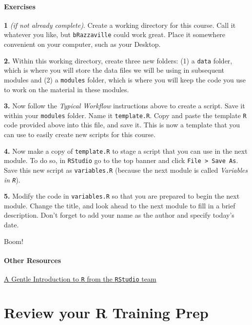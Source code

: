\documentclass[
]{book}
\begin{document}
\subsubsection*{Exercises}\label{exercises}

\textbf{1} \emph{(if not already complete)}. Create a working directory for this course. Call it whatever you like, but \texttt{bRazzaville} could work great. Place it somewhere convenient on your computer, such as your Desktop.

\textbf{2.} Within this working directory, create three new folders: (1) a \texttt{data} folder, which is where you will store the data files we will be using in subsequent modules and (2) a \texttt{modules} folder, which is where you will keep the code you use to work on the material in these modules.

\textbf{3.} Now follow the \emph{Typical Workflow} instructions above to create a script. Save it within your \texttt{modules} folder. Name it \texttt{template.R}. Copy and paste the template \texttt{R} code provided above into this file, and save it. This is now a template that you can use to easily create new scripts for this course.

\textbf{4.} Now make a copy of \texttt{template.R} to stage a script that you can use in the next module. To do so, in \texttt{RStudio} go to the top banner and click \texttt{File\ \textgreater{}\ Save\ As}. Save this new script as \texttt{variables.R} (because the next module is called \emph{Variables in \texttt{R}}).

\textbf{5.} Modify the code in \texttt{variables.R} so that you are prepared to begin the next module. Change the title, and look ahead to the next module to fill in a brief description. Don't forget to add your name as the author and specify today's date.

Boom!

\subsubsection*{Other Resources}\label{other-resources-1}

\href{https://www.rstudio.com/resources/webinars/a-gentle-introduction-to-tidy-statistics-in-r/}{A Gentle Introduction to \texttt{R} from the \texttt{RStudio} team}

\chapter{Review your R Training Prep}\label{review-your-r-training-prep}
\end{document}
